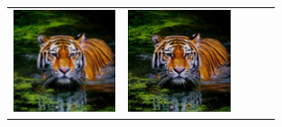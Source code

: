 \begin{table}[h!]
\begin{tabular}{>{\centering\arraybackslash}m{3cm} >{\centering\arraybackslash}m{3cm} >{\centering\arraybackslash}m{3cm} >{\centering\arraybackslash}m{3cm} >{\centering\arraybackslash}m{3cm}}
        \includegraphics[width=3cm]{images/blind_processed/tiger/gaussian_5x5_sigma1.0/tiger_unblurred_120-iter_25-psf-iter.png} &
        \includegraphics[width=3cm]{images/blind_processed/tiger/gaussian_5x5_sigma2.0/tiger_unblurred_120-iter_25-psf-iter.png}                                                                                                                         \\
    \end{tabular}
\end{table}

